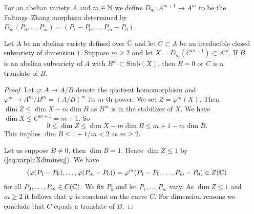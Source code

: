 \documentclass[12pt,oneside]{amsart}
\begin{document}
For an abelian variety $A$ and $m\in {\mathbb{N}}$ we define
$D_m \colon A^{m+1}\rightarrow A^m$ to be the Faltings--Zhang morphism
determined by 
$D_m(P_0,\ldots,P_m) = (P_1-P_0,\ldots,P_m-P_0)$. 


\begin{lemma}
  \label{lem:stabx}
  Let $A$ be an abelian variety defined over ${\mathbb{C}}$ and let $C\subset
  A$ be an irreducible closed subvariety of dimension $1$. Suppose $m\ge 2$ and let $X =
  D_m(C^{m+1})\subset A^m$. If $B$ is an abelian
  subvariety of $A$ with $B^m \subset \mathrm{Stab}(X)$, then $B=0$ or 
  $C$ is a translate of $B$.
\end{lemma}
\begin{proof}
  Let $\varphi \colon A\rightarrow A/B$ denote the quotient
  homomorphism and $\varphi^m \rightarrow A^m/B^m = (A/B)^m$ its
  $m$-th power. We set $Z = \varphi^m(X)$. 
  Then $\dim Z \le \dim X - m\dim B$ as $B^m$ is in the
  stabilizer of $X$.
  We have $\dim X \le C^{m+1}= m+1$. So
  \begin{equation}
    \label{eq:varphiXdimineq}
    0\le \dim Z \le \dim X - m\dim B \le m+1 -m\dim B.
  \end{equation}
  This implies $\dim B \le 1+1/m<2$ as $m\ge 2$.

  Let us suppose $B\not=0$, then $\dim B=1$.
  Hence $\dim Z\le 1$  by (\ref{eq:varphiXdimineq}).
  We have
  \begin{equation*}
    (\varphi(P_1-P_0),\ldots,\varphi(P_m-P_0))= \varphi^m(P_1-P_0,\ldots,P_m-P_0) \in Z({\mathbb{C}})
  \end{equation*}
  for all $P_0,\ldots,P_m\in C({\mathbb{C}})$. We fix $P_0$ and let
  $P_1,\ldots,P_m$ vary. As $\dim Z\le 1$ and $m\ge 2$ it
  follows that $\varphi$ is constant on the curve $C$.
  For dimension reasons we conclude that $C$ equals a
  translate of $B$. 
\end{proof}
\end{document}
